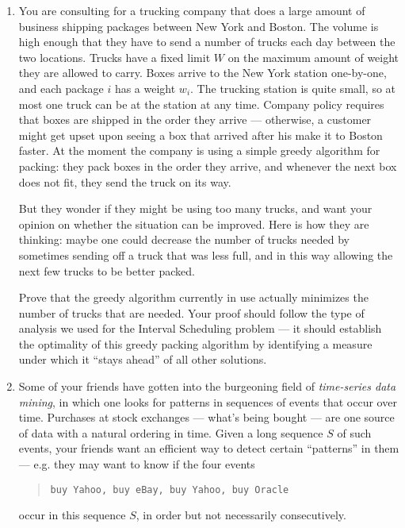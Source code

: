 \documentclass[12pt]{article}
\begin{document}
\begin{enumerate}


\item

You are consulting for a trucking company that does a large
amount of business shipping packages between New York and Boston.
The volume is high enough that they have to send
a number of trucks each day between the two locations. Trucks have a
fixed limit $W$ on the maximum amount of weight they are allowed to carry.
Boxes arrive to the New York station one-by-one, and each package $i$ has
a weight $w_i$. The trucking station is quite small, so at most one truck
can be at the station at any time. Company policy requires that boxes
are shipped in the order they arrive --- otherwise, a customer might
get upset upon seeing a box that arrived after his make it to Boston faster.
At the moment the company is using a simple greedy algorithm for packing:
they pack boxes in the order they arrive,
and whenever the next box does not fit, they send the truck on its way.

But they wonder if they might be using too many
trucks, and want your opinion on whether the situation can be
improved. Here is how they are thinking: maybe one could decrease the number
of trucks needed by sometimes sending off a truck that was less full,
and in this way allowing the next few trucks to be better packed.

Prove that the greedy algorithm currently in use actually minimizes the
number of trucks that are needed.  Your proof should follow the type of
analysis we used for the Interval Scheduling problem --- it should
establish the optimality of this greedy packing algorithm
by identifying a measure under which it ``stays ahead''
of all other solutions.


\item

Some of your friends have gotten into the
burgeoning field of {\em time-series data mining},
in which one looks for patterns in sequences of
events that occur over time.
Purchases at stock exchanges --- what's
being bought --- are one source
of data with a natural ordering in time.
Given a long sequence $S$ of such events, your friends
want an efficient way to detect certain
``patterns'' in them --- e.g. they may want
to know if the four events
\begin{quote}
{\tt buy Yahoo, buy eBay, buy Yahoo, buy Oracle}
\end{quote}
occur in this sequence $S$, in order but not necessarily consecutively.


\end{enumerate}
\end{document}
